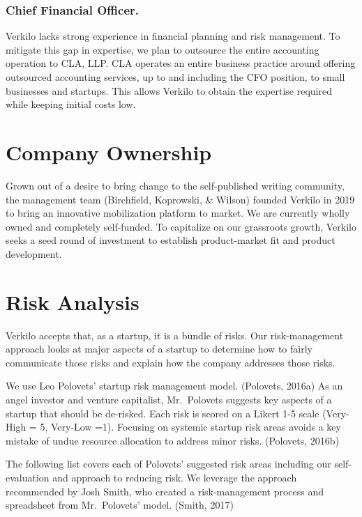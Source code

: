 \documentclass[10pt,openany]{book}
\begin{document}
\hypertarget{chief-financial-officer.}{%
\subsubsection{Chief Financial
Officer.}\label{chief-financial-officer.}}

Verkilo lacks strong experience in financial planning and risk
management. To mitigate this gap in expertise, we plan to outsource the
entire accounting operation to CLA, LLP. CLA operates an entire business
practice around offering outsourced accounting services, up to and
including the CFO position, to small businesses and startups. This
allows Verkilo to obtain the expertise required while keeping initial
costs low.

\hypertarget{company-ownership}{%
\section{Company Ownership}\label{company-ownership}}

Grown out of a desire to bring change to the self-published writing
community, the management team (Birchfield, Koprowski, \& Wilson)
founded Verkilo in 2019 to bring an innovative mobilization platform to
market. We are currently wholly owned and completely self-funded. To
capitalize on our grassroots growth, Verkilo seeks a seed round of
investment to establish product-market fit and product development.

\hypertarget{risk-analysis}{%
\section{Risk Analysis}\label{risk-analysis}}

Verkilo accepts that, as a startup, it is a bundle of risks. Our
risk-management approach looks at major aspects of a startup to
determine how to fairly communicate those risks and explain how the
company addresses those risks.

We use Leo Polovets' startup risk management model. (Polovets, 2016a) As
an angel investor and venture capitalist, Mr.~Polovets suggests key
aspects of a startup that should be de-risked. Each risk is scored on a
Likert 1-5 scale (Very-High = 5, Very-Low =1). Focusing on systemic
startup risk areas avoids a key mistake of undue resource allocation to
address minor risks. (Polovets, 2016b)

The following list covers each of Polovets' suggested risk areas
including our self-evaluation and approach to reducing risk. We leverage
the approach recommended by Josh Smith, who created a risk-management
process and spreadsheet from Mr.~Polovets' model. (Smith, 2017)
\end{document}

